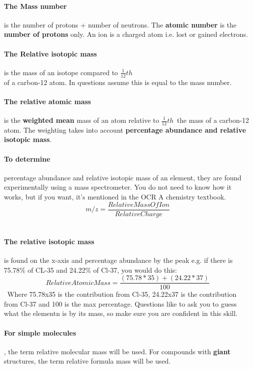 \paragraph{The Mass number} is the number of protons + number of neutrons. The \textbf{atomic number} is the \textbf{number of protons} only.
An ion is a charged atom i.e. lost or gained electrons.

\paragraph{The Relative isotopic mass}is the mass of an isotope compared to \(\frac{1}{12}th\)\\ of a carbon-12 atom. In questions assume this is equal to the mass number.

\paragraph{The relative atomic mass}is the \textbf{weighted mean} mass of an atom relative to  \(\frac{1}{12}th\)\ the mass of a carbon-12 atom. The weighting takes into account \textbf{percentage abundance and relative isotopic mass}. 

\paragraph{To determine} percentage abundance and relative isotopic mass of an element, they are found experimentally using a mass spectrometer. You do not need to know how it works, but if you want, it's mentioned in the OCR A chemistry textbook.
\[m/z= \frac{Relative Mass Of Ion}{Relative Charge}\]\
\paragraph{The relative isotopic mass} is found on the x-axis and percentage abundance by the peak e.g. if there is 75.78\% of CL-35 and 24.22\% of Cl-37, you would do this:
\[Relative Atomic Mass=\frac{(75.78*35)+(24.22*37)}{100}\]\
Where 75.78x35 is the contribution from Cl-35, 24.22x37 is the contribution from Cl-37 and 100 is the max percentage. Questions like to ask you to guess what the elementn is by its mass, so make sure you are confident in this skill. 
\paragraph{For simple molecules}, the term relative molecular mass will be used.
For compounds with \textbf{giant} structures, the term relative formula mass will be used.
